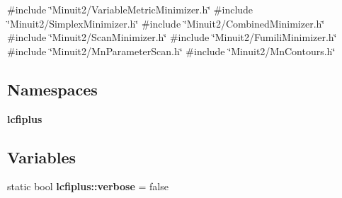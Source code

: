 {\ttfamily \#include \char`\"{}Minuit2/\+Variable\+Metric\+Minimizer.\+h\char`\"{}}\newline
{\ttfamily \#include \char`\"{}Minuit2/\+Simplex\+Minimizer.\+h\char`\"{}}\newline
{\ttfamily \#include \char`\"{}Minuit2/\+Combined\+Minimizer.\+h\char`\"{}}\newline
{\ttfamily \#include \char`\"{}Minuit2/\+Scan\+Minimizer.\+h\char`\"{}}\newline
{\ttfamily \#include \char`\"{}Minuit2/\+Fumili\+Minimizer.\+h\char`\"{}}\newline
{\ttfamily \#include \char`\"{}Minuit2/\+Mn\+Parameter\+Scan.\+h\char`\"{}}\newline
{\ttfamily \#include \char`\"{}Minuit2/\+Mn\+Contours.\+h\char`\"{}}\newline
\subsection*{Namespaces}
\begin{DoxyCompactItemize}
\item 
 \textbf{ lcfiplus}
\end{DoxyCompactItemize}
\subsection*{Variables}
\begin{DoxyCompactItemize}
\item 
static bool \textbf{ lcfiplus\+::verbose} = false
\end{DoxyCompactItemize}
